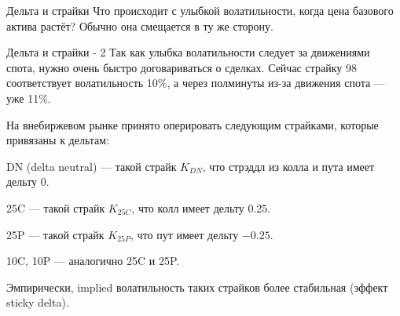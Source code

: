 \documentclass{beamer}
\begin{document}
\begin{frame}{Дельта и страйки}
\justify
Что происходит с улыбкой волатильности, когда цена базового актива растёт? Обычно она смещается в ту же сторону.

\centering
{}
\end{frame}



\begin{frame}{Дельта и страйки - 2}
\justify
Так как улыбка волатильности следует за движениями спота, нужно очень быстро договариваться о сделках. Сейчас страйку 98 соответствует волатильность 10\%, а через полминуты из-за движения спота --- уже 11\%.

\justify
На внебиржевом рынке принято оперировать следующим страйками, которые привязаны к дельтам:

\justify
DN (delta neutral) --- такой страйк $K_{DN}$, что стрэддл из колла и пута имеет дельту 0.

\justify
25C --- такой страйк $K_{25C}$, что колл имеет дельту 0.25.

\justify
25P --- такой страйк $K_{25P}$, что пут имеет дельту $-0.25$.

\justify
10C, 10P --- аналогично 25C и 25P.

\justify
Эмпирически, implied волатильность таких страйков более стабильная (эффект sticky delta).
\end{frame}



\newcommand{\drawVolNode}[4] {

	\node[
		circle,
		color=Set1-B,
		fill,
		inner sep=2pt
	] at (#1, #2) {};
	
	\node[anchor=#4] at (#1, #2) {$\sigma_{#3}$};
}
\end{document}
